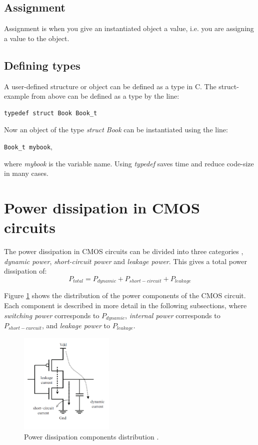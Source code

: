 \subsection{Assignment}
Assignment is when you give an instantiated object a value, i.e. you are assigning a value to the object.
\subsection{Defining types}
A user-defined structure or object can be defined as a type in C. The struct-example from above can be defined as a type by the line:
\begin{lstlisting}
typedef struct Book Book_t
\end{lstlisting}
Now an object of the type \textit{struct Book} can be instantiated using the line:

\verb!Book_t mybook!,

where \textit{mybook} is the variable name. Using \textit{typedef} saves time and reduce code-size in many cases.

\section{\label{sec:powdiss}Power dissipation in CMOS circuits}
The power dissipation in CMOS circuits can be divided into three categories \cite{panda2010power}, \textit{dynamic power}, \textit{short-circuit power} and \textit{leakage power}. This gives a total power dissipation of:
\begin{equation}
    P_{total} = P_{dynamic} + P_{short-circuit} + P_{leakage}
\end{equation}

Figure \cref{fig:powerdisscmos} shows the distribution of the power components of the CMOS circuit. Each component is described in more detail in the following subsections, where \textit{switching power} corresponds to $P_{dynamic}$, \textit{internal power} corresponds to $P_{short-curcuit}$, and \textit{leakage power} to $P_{leakage}$.
\begin{figure}[hbpt]
\centering
\includegraphics[width=0.4\textwidth]{../figs/PowerDissipation.png}
\caption{\label{fig:powerdisscmos}Power dissipation components distribution \cite{panda2010power}.}
\end{figure}

